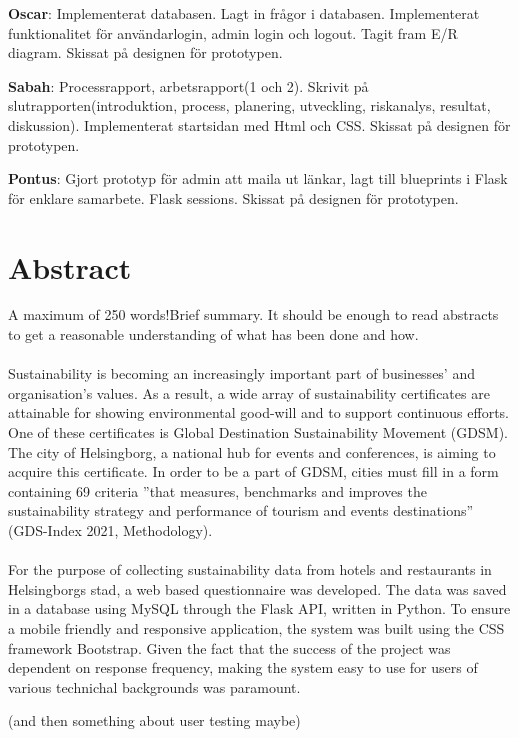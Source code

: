 \documentclass[12pt]{article}
\begin{document}
\textbf{Oscar}: Implementerat databasen. Lagt in frågor i databasen. Implementerat funktionalitet för användarlogin, admin login och logout. Tagit fram E/R diagram. Skissat på designen för prototypen.

\textbf{Sabah}: Processrapport, arbetsrapport(1 och 2). Skrivit på slutrapporten(introduktion, process, planering, utveckling, riskanalys, resultat, diskussion). Implementerat startsidan med Html och CSS. Skissat på designen för prototypen.  

\textbf{Pontus}: Gjort prototyp för admin att maila ut länkar, lagt till blueprints i Flask för enklare samarbete. Flask sessions. Skissat på designen för prototypen.

\newpage
\section{Abstract}
A maximum of 250 words!Brief summary. It should be enough to read abstracts to get a reasonable understanding of what has been done and how.
\\\\
Sustainability is becoming an increasingly important part of businesses’ and organisation’s values. As a result, a wide array of sustainability certificates are attainable for showing environmental good-will and to support continuous efforts. One of these certificates is Global Destination Sustainability Movement (GDSM). The city of Helsingborg, a national hub for events and conferences, is aiming to acquire this certificate. In order to be a part of GDSM, cities must fill in a form containing 69 criteria ”that measures, benchmarks and improves the sustainability strategy and performance of tourism and events destinations” (GDS-Index 2021, Methodology).\\\\
For the purpose of collecting sustainability data from hotels and restaurants in Helsingborgs stad, a web based questionnaire was developed. The data was saved in a database using MySQL through the Flask API, written in Python. To ensure a mobile friendly and responsive application, the system was built using the CSS framework Bootstrap. 
Given the fact that the success of the project was dependent on response frequency, making the system easy to use for users of various technichal backgrounds was paramount. 

(and then something about user testing maybe)

\newpage
\end{document}
